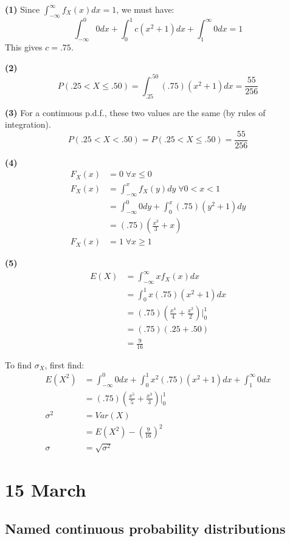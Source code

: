 \documentclass[12pt]{article}
\begin{document}
\textbf{(1)} Since $\int_{-\infty}^{\infty} f_X (x) dx = 1$, we must have:
\[
    \int_{-\infty}^{0} 0 dx + \int_{0}^{1} c(x^2 + 1) dx + \int_{1}^{\infty} 0 dx = 1
\]
This gives $c=.75$.

\textbf{(2)}
\[
    P(.25 < X \leq .50) = \int_{.25}^{.50} (.75)(x^2 + 1) dx = \frac{55}{256}
\]

\textbf{(3)} For a continuous p.d.f., these two values are the same (by rules of integration).
\[
    P(.25 < X < .50) = P(.25 < X \leq .50) = \frac{55}{256}
\]

\textbf{(4)}
\begin{align*}
    F_X (x) &= 0 \; \forall x \leq 0 \\
    F_X (x) &= \int_{-\infty}^{x} f_X (y) dy \; \forall 0 < x < 1 \\
        &= \int_{-\infty}^{0} 0 dy + \int_{0}^{x} (.75)(y^2 + 1) dy \\
        &= (.75)(\frac{x^3}{3} + x) \\
    F_X (x) &= 1 \; \forall x \geq 1
\end{align*}

\textbf{(5)}
\begin{align*}
    E(X) &= \int_{-\infty}^{\infty} x f_X (x) dx \\
        &= \int_{0}^{1} x (.75) (x^2 + 1) dx \\
        &= (.75) (\frac{x^4}{4} + \frac{x^2}{2}) \Bigr|_0^1 \\
        &= (.75)(.25 + .50) \\
        &= \frac{9}{16}
\end{align*}

To find $\sigma_X$, first find:
\begin{align*}
    E(X^2) &= \int_{-\infty}^{0} 0 dx + \int_0^1 x^2 (.75) (x^2 + 1) dx + \int_1^{\infty} 0 dx \\
        &= (.75)(\frac{x^5}{5} + \frac{x^3}{3}) \Bigr|_0^1 \\
    \sigma^2 &= Var(X) \\
        &= E(X^2) - (\frac{9}{16})^2 \\
    \sigma &= \sqrt{\sigma^2}
\end{align*}

\section{15 March}
\subsection{Named continuous probability distributions}
\end{document}
